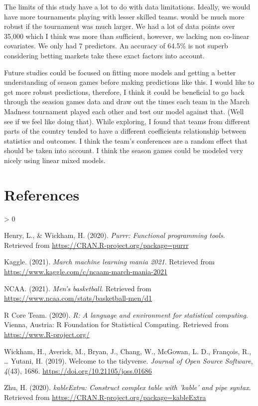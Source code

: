 \documentclass[
  man,floatsintext]{apa6}
\newlength{\cslhangindent}
\newenvironment{CSLReferences}[2] %
 {%
  \setlength{\parindent}{0pt}
  \ifodd #1 \everypar{\setlength{\hangindent}{\cslhangindent}}\ignorespaces\fi
  \ifnum #2 > 0
  \setlength{\parskip}{#2\baselineskip}
  \fi
 }%
 {}
\begin{document}
The limits of this study have a lot to do with data limitations. Ideally, we would have more tournaments playing with lesser skilled teams. would be much more robust if the tournament was much larger. We had a lot of data points over 35,000 which I think was more than sufficient, however, we lacking non co-linear covariates. We only had 7 predictors. An accuracy of 64.5\% is not superb considering betting markets take these exact factors into account.

Future studies could be focused on fitting more models and getting a better understanding of season games before making predictions like this. I would like to get more robust predictions, therefore, I think it could be beneficial to go back through the seasion games data and draw out the times each team in the March Madness tournament played each other and test our model against that. (Well see if we feel like doing that). While exploring, I found that teams from different parts of the country tended to have a different coefficients relationship between statistics and outcomes. I think the team's conferences are a random effect that should be taken into account. I think the season games could be modeled very nicely using linear mixed models.

\newpage

\hypertarget{references}{%
\section{References}\label{references}}

\begingroup
\setlength{\parindent}{-0.5in}
\setlength{\leftskip}{0.0in}

\hypertarget{refs}{}
\begin{CSLReferences}{1}{0}
\leavevmode\hypertarget{ref-R-purrr}{}%
Henry, L., \& Wickham, H. (2020). \emph{Purrr: Functional programming tools}. Retrieved from \url{https://CRAN.R-project.org/package=purrr}

\leavevmode\hypertarget{ref-R-Kaggle}{}%
Kaggle. (2021). \emph{March machine learning mania 2021}. Retrieved from \url{https://www.kaggle.com/c/ncaam-march-mania-2021}

\leavevmode\hypertarget{ref-R-NCAA}{}%
NCAA. (2021). \emph{Men's basketball}. Retrieved from \url{https://www.ncaa.com/stats/basketball-men/d1}

\leavevmode\hypertarget{ref-R-base}{}%
R Core Team. (2020). \emph{R: A language and environment for statistical computing}. Vienna, Austria: R Foundation for Statistical Computing. Retrieved from \url{https://www.R-project.org/}

\leavevmode\hypertarget{ref-R-tidyverse}{}%
Wickham, H., Averick, M., Bryan, J., Chang, W., McGowan, L. D., François, R., \ldots{} Yutani, H. (2019). Welcome to the {tidyverse}. \emph{Journal of Open Source Software}, \emph{4}(43), 1686. \url{https://doi.org/10.21105/joss.01686}

\leavevmode\hypertarget{ref-R-kableExtra}{}%
Zhu, H. (2020). \emph{kableExtra: Construct complex table with 'kable' and pipe syntax}. Retrieved from \url{https://CRAN.R-project.org/package=kableExtra}

\end{CSLReferences}

\endgroup
\end{document}

